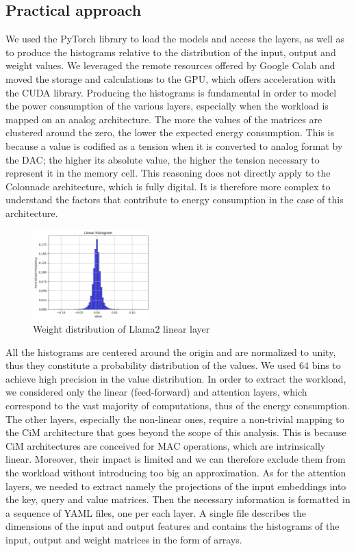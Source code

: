 \documentclass[conference]{IEEEtran}
\begin{document}
\subsection{Practical approach}
We used the PyTorch library to load the models and access the layers, as well as to produce the histograms relative to the distribution of the input, output and weight values. We leveraged the remote resources offered by Google Colab and moved the storage and calculations to the GPU, which offers acceleration with the CUDA library. Producing the histograms is fundamental in order to model the power consumption of the various layers, especially when the workload is mapped on an analog architecture. The more the values of the matrices are clustered around the zero, the lower the expected energy consumption. This is because a value is codified as a tension when it is converted to analog format by the DAC; the higher its absolute value, the higher the tension necessary to represent it in the memory cell. This reasoning does not directly apply to the Colonnade architecture, which is fully digital. It is therefore more complex to understand the factors that contribute to energy consumption in the case of this architecture. 

\begin{figure}[ht]
    \centering
    \includegraphics[width=0.4\textwidth]{images/histogram_llama2.png}
    \caption{Weight distribution of Llama2 linear layer}
    \label{fig:llama2_hist}
\end{figure}

All the histograms are centered around the origin and are normalized to unity, thus they constitute a probability distribution of the values. We used 64 bins to achieve high precision in the value distribution. 
In order to extract the workload, we considered only the linear (feed-forward) and attention layers, which correspond to the vast majority of computations, thus of the energy consumption. The other layers, especially the non-linear ones, require a non-trivial mapping to the CiM architecture that goes beyond the scope of this analysis. This is because CiM architectures are conceived for MAC operations, which are intrinsically linear. Moreover, their impact is limited and we can therefore exclude them from the workload without introducing too big an approximation. As for the attention layers, we needed to extract namely the projections of the input embeddings into the key, query and value matrices.
Then the necessary information is formatted in a sequence of YAML files, one per each layer. A single file describes the dimensions of the input and output features and contains the histograms of the input, output and weight matrices in the form of arrays. 
\end{document}
